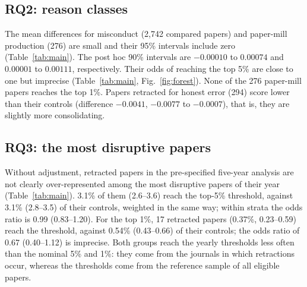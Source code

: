 \subsection{RQ2: reason classes}
The mean differences for misconduct (2,742 compared papers) and paper-mill production (276) are small
and their 95\% intervals include zero (Table~\ref{tab:main}). The post hoc 90\% intervals are $-0.00010$ to $0.00074$
and $0.00001$ to $0.00111$, respectively.
Their odds of reaching the top 5\% are close to one but imprecise (Table~\ref{tab:main},
Fig.~\ref{fig:forest}). None of the 276 paper-mill papers reaches the top 1\%. Papers retracted for honest error (294)
score lower than their controls (difference $-0.0041$, $-0.0077$ to $-0.0007$), that is, they are slightly more
consolidating.

\subsection{RQ3: the most disruptive papers}
Without adjustment, retracted papers in the pre-specified five-year analysis are not clearly over-represented among the
most disruptive papers of their year
(Table~\ref{tab:main}). 3.1\% of them (2.6--3.6) reach the top-5\% threshold, against 3.1\% (2.8--3.5) of their
controls, weighted in the same way; within strata the odds ratio is 0.99 (0.83--1.20). For the top 1\%, 17
retracted papers (0.37\%, 0.23--0.59) reach the threshold, against 0.54\% (0.43--0.66) of their controls; the odds
ratio of 0.67 (0.40--1.12) is imprecise. Both groups reach the yearly thresholds less often than
the nominal 5\% and 1\%: they come from the journals in which retractions occur, whereas the thresholds come from the
reference sample of all eligible papers.

\begin{table}[t]
\centering
\caption{CD$_5$ of retracted papers (primary set) versus controls from the same journal and year, by reason class.
Diff.: stratified mean difference ($\times 10^{-3}$, 95\% bootstrap CI). OR: Mantel--Haenszel odds ratio (95\% CI).
$n$: retracted papers in strata with a defined control score, not all scored retracted papers.}
\label{tab:main}
\end{table}

